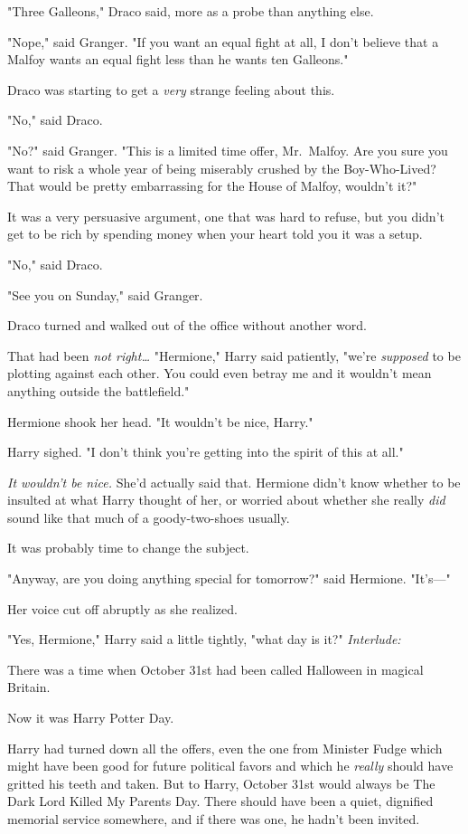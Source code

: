"Three Galleons," Draco said, more as a probe than anything else.

"Nope," said Granger. "If you want an equal fight at all, I don't believe that 
a Malfoy wants an equal fight less than he wants ten Galleons."

Draco was starting to get a \emph{very} strange feeling about this.

"No," said Draco.

"No?" said Granger. "This is a limited time offer, Mr.~Malfoy. Are you sure you 
want to risk a whole year of being miserably crushed by the Boy-Who-Lived? That 
would be pretty embarrassing for the House of Malfoy, wouldn't it?"

It was a very persuasive argument, one that was hard to refuse, but you didn't 
get to be rich by spending money when your heart told you it was a setup.

"No," said Draco.

"See you on Sunday," said Granger.

Draco turned and walked out of the office without another word.

That had been \emph{not right{\ldots}}
\sbreak
"Hermione," Harry said patiently, "we're \emph{supposed} to be plotting against 
each other. You could even betray me and it wouldn't mean anything outside the 
battlefield."

Hermione shook her head. "It wouldn't be nice, Harry."

Harry sighed. "I don't think you're getting into the spirit of this at all."

\emph{It wouldn't be nice.} She'd actually said that. Hermione didn't know 
whether to be insulted at what Harry thought of her, or worried about whether 
she really \emph{did} sound like that much of a goody-two-shoes usually.

It was probably time to change the subject.

"Anyway, are you doing anything special for tomorrow?" said Hermione. "It's---"

Her voice cut off abruptly as she realized.

"Yes, Hermione," Harry said a little tightly, "what day is it?"
\sbreak
\emph{Interlude:}

There was a time when October 31st had been called Halloween in magical Britain.

Now it was Harry Potter Day.

Harry had turned down all the offers, even the one from Minister Fudge which 
might have been good for future political favors and which he \emph{really} 
should have gritted his teeth and taken. But to Harry, October 31st would 
always be The Dark Lord Killed My Parents Day. There should have been a quiet, 
dignified memorial service somewhere, and if there was one, he hadn't been 
invited.

